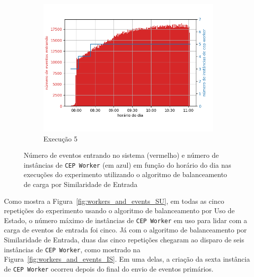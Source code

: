 \begin{figure}[h!]
\begin{subfigure}{.5\textwidth}
  \includegraphics[width=\linewidth]{figuras/graphics/carga_e_workers_horario10-dez-is.png}  
  \caption{Execução 5}
  \label{fig:cewh-10-dez-is}
\end{subfigure}
\caption{Número de eventos entrando no sistema (vermelho)  e número de instâncias de \texttt{CEP Worker} (em azul) em função do horário do dia nas  execuções do experimento utilizando o algoritmo de balanceamento de carga por Similaridade de Entrada}
\label{fig:load_and_instances-time-IS}
\end{figure}


Como mostra a Figura~\ref{fig:workers_and_events_SU}, em todas as cinco repetições do experimento usando o algoritmo de balanceamento por Uso de Estado, o número máximo de instâncias de \texttt{CEP Worker} em uso para lidar com a carga de eventos de entrada foi cinco. Já com o algoritmo de balanceamento por Similaridade de Entrada, duas das cinco repetições chegaram ao disparo de seis instâncias de \texttt{CEP Worker}, como mostrado na Figura~\ref{fig:workers_and_events_IS}. Em uma delas, a criação da sexta instância de \texttt{CEP Worker} ocorreu depois do final do envio de eventos primários. 




